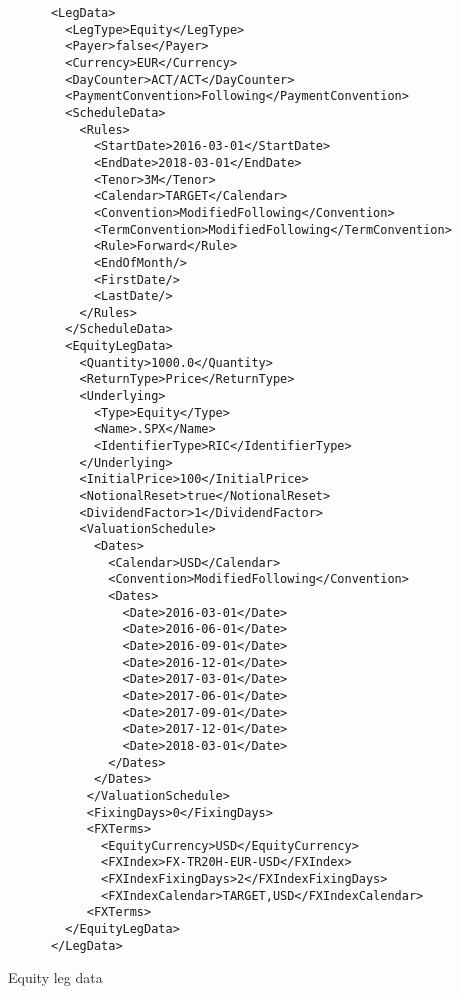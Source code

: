 \begin{listing}[H]
\begin{verbatim}
      <LegData>
        <LegType>Equity</LegType>
        <Payer>false</Payer>
        <Currency>EUR</Currency>
        <DayCounter>ACT/ACT</DayCounter>
        <PaymentConvention>Following</PaymentConvention>
        <ScheduleData>
          <Rules>
            <StartDate>2016-03-01</StartDate>
            <EndDate>2018-03-01</EndDate>
            <Tenor>3M</Tenor>
            <Calendar>TARGET</Calendar>
            <Convention>ModifiedFollowing</Convention>
            <TermConvention>ModifiedFollowing</TermConvention>
            <Rule>Forward</Rule>
            <EndOfMonth/>
            <FirstDate/>
            <LastDate/>
          </Rules>
        </ScheduleData>
        <EquityLegData>
          <Quantity>1000.0</Quantity>
          <ReturnType>Price</ReturnType>
          <Underlying>
            <Type>Equity</Type>
            <Name>.SPX</Name>
            <IdentifierType>RIC</IdentifierType>
          </Underlying>
          <InitialPrice>100</InitialPrice>
          <NotionalReset>true</NotionalReset>
          <DividendFactor>1</DividendFactor>
          <ValuationSchedule>
            <Dates>
              <Calendar>USD</Calendar>
              <Convention>ModifiedFollowing</Convention>
              <Dates>
                <Date>2016-03-01</Date>
                <Date>2016-06-01</Date>
                <Date>2016-09-01</Date>
                <Date>2016-12-01</Date>
                <Date>2017-03-01</Date>
                <Date>2017-06-01</Date>
                <Date>2017-09-01</Date>
                <Date>2017-12-01</Date>
                <Date>2018-03-01</Date>
              </Dates>
            </Dates>
           </ValuationSchedule>
           <FixingDays>0</FixingDays>
           <FXTerms>
             <EquityCurrency>USD</EquityCurrency>
             <FXIndex>FX-TR20H-EUR-USD</FXIndex>
             <FXIndexFixingDays>2</FXIndexFixingDays>
             <FXIndexCalendar>TARGET,USD</FXIndexCalendar>
           <FXTerms>
        </EquityLegData>
      </LegData>
\end{verbatim}
\caption{Equity leg data}
\label{lst:equitylegdata}
\end{listing}
